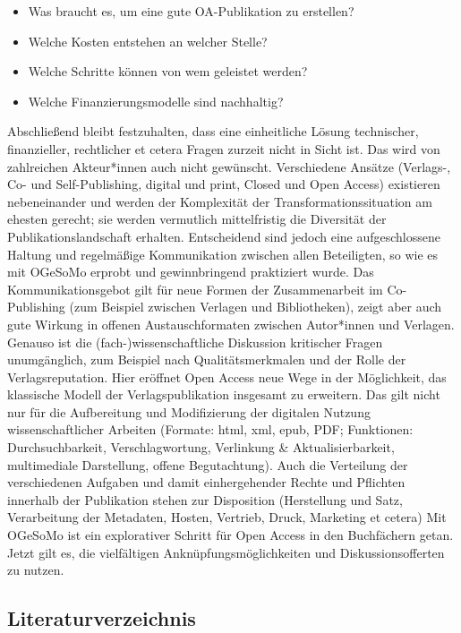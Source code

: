 \documentclass[a4paper,
fontsize=11pt,
oneside,
numbers=noperiodatend,
parskip=half-,
bibliography=totoc,
final
]{scrartcl}
\begin{document}
\begin{itemize}

\item
  Was braucht es, um eine gute OA-Publikation zu erstellen?
\item
  Welche Kosten entstehen an welcher Stelle?
\item
  Welche Schritte können von wem geleistet werden?
\item
  Welche Finanzierungsmodelle sind nachhaltig?
\end{itemize}

Abschließend bleibt festzuhalten, dass eine einheitliche Lösung
technischer, finanzieller, rechtlicher et cetera Fragen zurzeit nicht in
Sicht ist. Das wird von zahlreichen Akteur*innen auch nicht gewünscht.
Verschiedene Ansätze (Verlags-, Co- und Self-Publishing, digital und
print, Closed und Open Access) existieren nebeneinander und werden der
Komplexität der Transformationssituation am ehesten gerecht; sie werden
vermutlich mittelfristig die Diversität der Publikationslandschaft
erhalten. Entscheidend sind jedoch eine aufgeschlossene Haltung und
regelmäßige Kommunikation zwischen allen Beteiligten, so wie es mit
OGeSoMo erprobt und gewinnbringend praktiziert wurde. Das
Kommunikationsgebot gilt für neue Formen der Zusammenarbeit im
Co-Publishing (zum Beispiel zwischen Verlagen und Bibliotheken), zeigt
aber auch gute Wirkung in offenen Austauschformaten zwischen Autor*innen
und Verlagen. Genauso ist die (fach-)wissenschaftliche Diskussion
kritischer Fragen unumgänglich, zum Beispiel nach Qualitätsmerkmalen und
der Rolle der Verlagsreputation. Hier eröffnet Open Access neue Wege in
der Möglichkeit, das klassische Modell der Verlagspublikation insgesamt
zu erweitern. Das gilt nicht nur für die Aufbereitung und Modifizierung
der digitalen Nutzung wissenschaftlicher Arbeiten (Formate: html, xml,
epub, PDF; Funktionen: Durchsuchbarkeit, Verschlagwortung, Verlinkung \&
Aktualisierbarkeit, multimediale Darstellung, offene Begutachtung). Auch
die Verteilung der verschiedenen Aufgaben und damit einhergehender
Rechte und Pflichten innerhalb der Publikation stehen zur Disposition
(Herstellung und Satz, Verarbeitung der Metadaten, Hosten, Vertrieb,
Druck, Marketing et cetera) Mit OGeSoMo ist ein explorativer Schritt für
Open Access in den Buchfächern getan. Jetzt gilt es, die vielfältigen
Anknüpfungsmöglichkeiten und Diskussionsofferten zu nutzen.

\hypertarget{literaturverzeichnis}{%
\subsection{Literaturverzeichnis}\label{literaturverzeichnis}}
\end{document}

